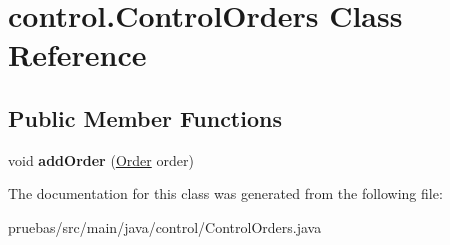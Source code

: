 \hypertarget{classcontrol_1_1_control_orders}{}\section{control.\+Control\+Orders Class Reference}
\label{classcontrol_1_1_control_orders}
\subsection*{Public Member Functions}
\begin{DoxyCompactItemize}
\item 
\mbox{\label{classcontrol_1_1_control_orders_a493848f32197cff514cb9ff6e7d3ed05}} 
void {\bfseries add\+Order} (\mbox{\hyperlink{classclases_1_1_order}{Order}} order)
\end{DoxyCompactItemize}


The documentation for this class was generated from the following file\+:\begin{DoxyCompactItemize}
\item 
pruebas/src/main/java/control/Control\+Orders.\+java\end{DoxyCompactItemize}

